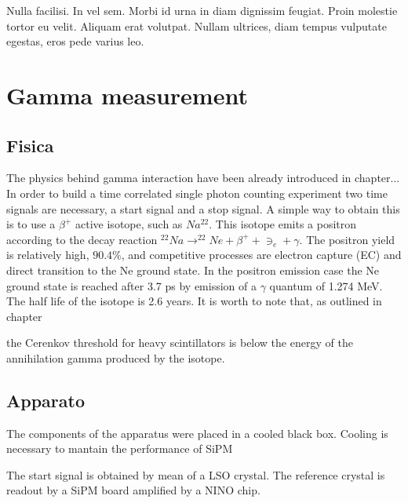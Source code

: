 \begin{savequote}[75mm] 
Nulla facilisi. In vel sem. Morbi id urna in diam dignissim feugiat. Proin molestie tortor eu velit. Aliquam erat volutpat. Nullam ultrices, diam tempus vulputate egestas, eros pede varius leo.
\end{savequote}

\chapter{Gamma measurement}


\section{Fisica}

The physics behind gamma interaction have been already introduced in chapter...
In order to build a time correlated single photon counting experiment two time signals are necessary, a start signal and a stop signal.
A simple way to obtain this is to use a $\beta ^{+}$ active isotope, such as $Na^{22}$. This isotope emits a positron according to the decay reaction $^{22}Na \rightarrow ^{22}Ne + \beta ^{+} + \ni _{e} + \gamma$. The positron yield is relatively high, $90.4\%$, and competitive processes are electron capture (EC) and direct transition to the Ne ground state. 
In the positron emission case the Ne ground state is reached after 3.7 ps by emission of a $\gamma$ quantum of 1.274 MeV. The half life of the isotope is 2.6 years.
It is worth to note that, as outlined in chapter

the Cerenkov threshold for heavy scintillators is below the energy of the annihilation gamma produced by the isotope.


\section{Apparato}
The components of the apparatus were placed in a cooled black box.
Cooling is necessary to mantain the performance of SiPM

The start signal is obtained by mean of a LSO crystal. The reference crystal is readout by a SiPM board amplified by a NINO chip. 



